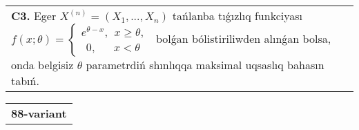 \documentclass{article}
\begin{document}
\begin{tabular}{m{17cm}}
 \\
\textbf{C3.} 
Eger \(X^{(n)} = \left( X_{1},...,X_{n} \right)\) tańlanba tıǵızlıq funkciyası
$f(x;\theta) = \left\{ \begin{matrix}
e^{\theta - x},\ \ x \geq \theta, \\
\ \ 0,\ \ \ \ \ \ \ x < \theta
\end{matrix} \right.\ $
bolǵan bólistiriliwden alınǵan bolsa, onda belgisiz \(\theta\) parametrdiń shınlıqqa maksimal uqsaslıq bahasın tabıń.
 \\

\end{tabular}
\vspace{1cm}


\begin{tabular}{m{17cm}}
\textbf{88-variant}
\newline


\end{tabular}
\end{document}
